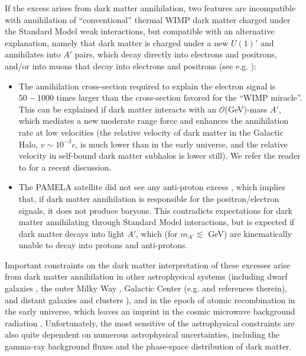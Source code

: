 If the excess arises from dark matter annihilation, two features are incompatible with annihilation of ``conventional'' thermal WIMP dark matter charged under the Standard Model weak interactions, but compatible with an alternative explanation, namely that dark matter is charged under a new $U(1)'$ and annihilates into $A'$ pairs, which decay directly into electrons and positrons, and/or into muons that decay into electrons and positrons (see e.g. \cite{ArkaniHamed:2008qn,Pospelov:2008jd,Cirelli:2008pk,Cholis:2008qq,Cholis:2008wq}): 
\begin{itemize}
\item The annihilation cross-section required to explain the electron signal is $50-1000$ times larger than the cross-section favored for the ``WIMP miracle''.   This can be explained if dark matter interacts with an $\mathcal{O}$(GeV)-mass $A'$, which mediates a new moderate range force and enhances the annihilation rate at low velocities (the relative velocity of dark matter in the Galactic Halo, $v\sim 10^{-3} c$, is much lower than in the early universe, and the relative velocity in self-bound dark matter subhalos is lower still).  We refer the reader to \cite{Finkbeiner:2010sm,Slatyer:2011kg} for a recent discussion.
\item The PAMELA satellite did not see any anti-proton excess \cite{Adriani:2008zq}, which implies that, if dark matter annihilation is responsible for the positron/electron signals, it does not produce baryons.  This contradicts expectations for dark matter annihilating through Standard Model interactions, but is expected if dark matter decays into light $A'$, which (for $m_{A'}\lesssim$ GeV) are kinematically unable to decay into protons and anti-protons.
\end{itemize}

Important constraints on the dark matter interpretation of these excesses arise from dark matter annihilation in other astrophysical systems (including dwarf galaxies \cite{Ackermann:2011wa}, the outer Milky Way \cite{DiffuseGalactic}, Galactic Center (e.g. \cite{Papucci:2009gd,Hutsi:2010ai} and references therein), and distant galaxies \cite{Hutsi:2010ai,extragalactic} and clusters \cite{Huang:2011xr}), and in the epoch of atomic recombination in the early universe, which leaves an imprint in the cosmic microwave background radiation \cite{CMBrefs}. 
Unfortunately, the most sensitive of the astrophysical constraints are also quite dependent on numerous astrophysical uncertainties, including the gamma-ray background fluxes and the phase-space distribution of dark matter.  

